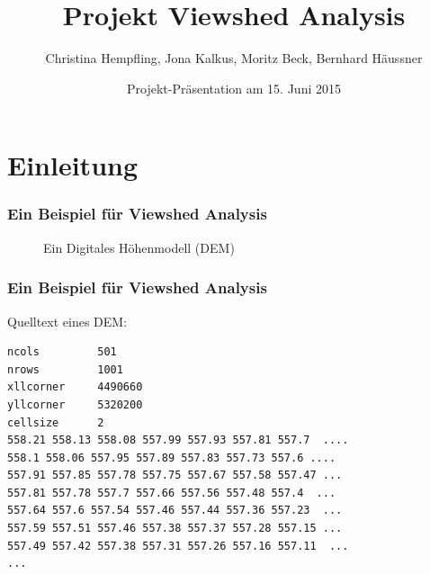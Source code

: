 \documentclass{beamer}
\begin{document}
\subject{Algorithmen für geographische Informationssysteme}
\title{Projekt Viewshed Analysis}
\author{Christina Hempfling, Jona Kalkus, Moritz Beck, Bernhard Häussner}
\date{Projekt-Präsentation am 15. Juni 2015}
\maketitle


\section{Einleitung}

\begin{frame}
  \frametitle{Ein Beispiel für Viewshed Analysis}
  \begin{figure}[h]
    \centering
    \caption{Ein Digitales Höhenmodell (DEM) }
    \label{fig:example}
  \end{figure}
\end{frame}

\begin{frame}[fragile]
  \frametitle{Ein Beispiel für Viewshed Analysis}
Quelltext eines DEM:
\begin{verbatim}
ncols         501
nrows         1001
xllcorner     4490660
yllcorner     5320200
cellsize      2
558.21 558.13 558.08 557.99 557.93 557.81 557.7  ....
558.1 558.06 557.95 557.89 557.83 557.73 557.6 ....
557.91 557.85 557.78 557.75 557.67 557.58 557.47 ...
557.81 557.78 557.7 557.66 557.56 557.48 557.4  ...
557.64 557.6 557.54 557.46 557.44 557.36 557.23  ...
557.59 557.51 557.46 557.38 557.37 557.28 557.15 ...
557.49 557.42 557.38 557.31 557.26 557.16 557.11  ...
...
\end{verbatim}

\end{frame}
\end{document}
